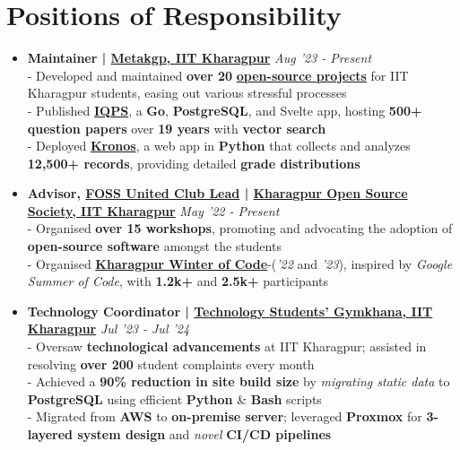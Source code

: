 \documentclass[a4paper,10pt]{extarticle} %
\begin{document}
\section{\textcolor{primary}{Positions of Responsibility}}
\vspace{+0.2cm}

\begin{itemize}[leftmargin=0.55cm, rightmargin=0.2cm, label={\Large\textbullet}]

\item \textbf{Maintainer | \href{https://metakgp.org/}{Metakgp, IIT Kharagpur}} \hfill{\textit{Aug '23 - Present}}\\
- Developed and maintained \textbf{over 20} \textbf{\href{https://github.com/metakgp}{open-source projects}} for IIT Kharagpur students, easing out various stressful processes \\
- Published \href{https://qp.metakgp.org}{\textbf{IQPS}}, a \textbf{Go}, \textbf{PostgreSQL}, and Svelte app, hosting \textbf{500+ question papers} over \textbf{19 years} with \textbf{vector search} \\
- Deployed \href{https://kronos.streamlit.app}{\textbf{Kronos}}, a web app in \textbf{Python} that collects and analyzes \textbf{12,500+ records}, providing detailed \textbf{grade distributions}

\item \textbf{Advisor, \href{https://fossunited.org/clubs}{\textbf{FOSS United Club Lead}} | \href{https://kossiitkgp.org}{Kharagpur Open Source Society, IIT Kharagpur}} \hfill{\textit{May '22 - Present}}\\
- Organised \textbf{over 15 workshops}, promoting and advocating the adoption of \textbf{open-source software} amongst the students \\
- Organised \textbf{\href{https://kwoc.kossiitkgp.org/}{Kharagpur Winter of Code}}-(\textit{'22} and \textit{'23}), inspired by \textit{Google Summer of Code}, with \textbf{1.2k+} and \textbf{2.5k+} participants

\item \textbf{Technology Coordinator | \href{https://gymkhana.iitkgp.ac.in/}{Technology Students' Gymkhana, IIT Kharagpur}} \hfill{\textit{Jul '23 - Jul '24}}\\
- Oversaw \textbf{technological advancements} at IIT Kharagpur;  assisted in resolving \textbf{over 200} student complaints every month \\
- Achieved a \textbf{90\% reduction in site build size} by \textit{migrating static data} to \textbf{PostgreSQL} using efficient \textbf{Python} \& \textbf{Bash} scripts \\
- Migrated from \textbf{AWS} to \textbf{on-premise server}; leveraged \textbf{Proxmox} for \textbf{3-layered system design} and \textit{novel} \textbf{CI/CD pipelines}

\end{itemize}
\end{document}
